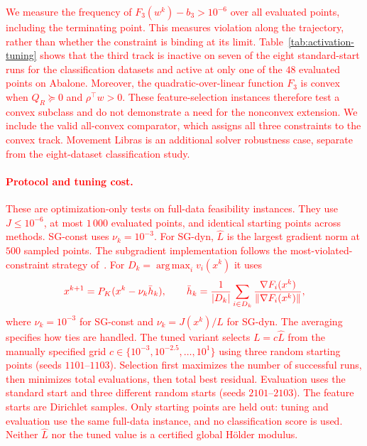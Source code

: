 \documentclass[]{interact}
\theoremstyle{plain}
\theoremstyle{definition}
\theoremstyle{remark}
\DeclareMathOperator*{\argmax}{arg\,max}
\begin{document}
\leavevmode\textcolor{red}{We measure the frequency of $F_3(w^k)-b_3>10^{-6}$ over all evaluated
points, including the terminating point. This measures violation along the
trajectory, rather than whether the constraint is binding at its limit.
Table~\ref{tab:activation-tuning} shows that the third track is inactive
on seven of the eight standard-start runs for the classification datasets and active at only one
of the $48$ evaluated points on Abalone. Moreover, the quadratic-over-linear
function $F_3$ is convex when $Q_R\succeq0$ and $\rho^\top w>0$.
These feature-selection instances therefore test a convex subclass and do
not demonstrate a need for the nonconvex extension. We include the valid
all-convex comparator, which assigns all three constraints to the convex
track. Movement Libras is an additional solver robustness case, separate
from the eight-dataset classification study.}

\paragraph*{\textcolor{red}{Protocol and tuning cost.}}
\leavevmode\textcolor{red}{These are optimization-only tests on full-data feasibility instances.
They use $J\le10^{-6}$, at most $1\,000$ evaluated points, and identical
starting points across methods. SG-const uses $\nu_k=10^{-3}$. For SG-dyn,
$\widehat L$ is the largest gradient norm at $500$ sampled points.
The subgradient implementation follows the most-violated-constraint
strategy of~\citep{hu2022quasi}. For $D_k=\argmax_i v_i(x^k)$ it uses}
\[\textcolor{red}{
x^{k+1}=P_K(x^k-\nu_k\bar h_k),\qquad
\bar h_k=\frac1{|D_k|}\sum_{i\in D_k}
\frac{\nabla F_i(x^k)}{\|\nabla F_i(x^k)\|},
}\]
\leavevmode\textcolor{red}{where $\nu_k=10^{-3}$ for SG-const and $\nu_k=J(x^k)/L$ for SG-dyn.
The averaging specifies how ties are handled.
The tuned variant selects $L=c\widehat L$ from the manually specified grid
$c\in\{10^{-3},10^{-2.5},\ldots,10^1\}$ using three random starting
points (seeds $1101$--$1103$). Selection first maximizes the number of
successful runs, then minimizes total evaluations, then total best residual.
Evaluation uses the standard start and three different random starts
(seeds $2101$--$2103$). The feature starts are Dirichlet samples.
Only starting points are held out: tuning and evaluation use the same
full-data instance, and no classification score is used. Neither
$\widehat L$ nor the tuned value is a certified global H\"older modulus.}
\end{document}
